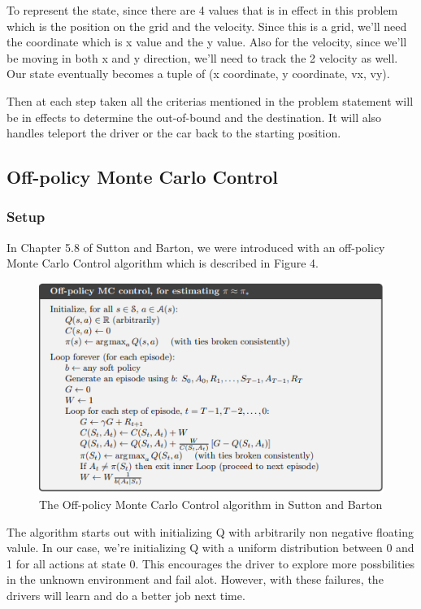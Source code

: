 \documentclass{article}
\begin{document}
To represent the state, since there are 4 values that is in effect in this
problem which is the position on the grid and the velocity. Since this is a
grid, we'll need the coordinate which is x value and the y value. Also for the
velocity, since we'll be moving in both x and y direction, we'll need to track
the 2 velocity as well. Our state eventually becomes a tuple of (x coordinate, y
coordinate, vx, vy).

Then at each step taken all the criterias mentioned in the problem statement
will be in effects to determine the out-of-bound and the destination. It will
also handles teleport the driver or the car back to the starting position.

\subsection{Off-policy Monte Carlo Control}
\subsubsection{Setup}
In Chapter 5.8 of Sutton and Barton, we were introduced with an off-policy Monte
Carlo Control algorithm which is described in Figure 4.

\begin{figure}[h!]
\centering
\includegraphics[scale=0.9]{./images/op-mc-algo.png}
\caption{The Off-policy Monte Carlo Control algorithm in Sutton and Barton
\cite{sutton-barton-rl}}
\label{fig:op-mc-algo}
\end{figure}

The algorithm starts out with initializing Q with arbitrarily non negative
floating valule. In our case, we're initializing Q with a uniform distribution
between 0 and 1 for all actions at state 0. This encourages the driver to
explore more possbilities in the unknown environment and fail alot. However,
with these failures, the drivers will learn and do a better job next time.
\end{document}
